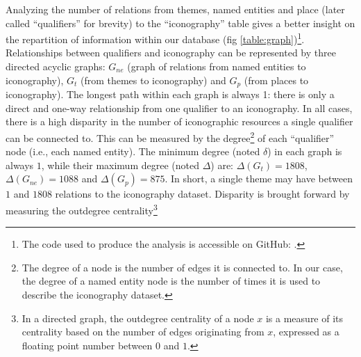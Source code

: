 \documentclass[12pt, a4paper, twocolumn]{article}
\begin{document}
Analyzing the number of relations from themes, named entities and place (later called ``qualifiers'' for brevity) to the ``iconography'' table gives a better insight on the repartition of information within our database (fig \ref{table:graph})\footnote{%
    The code used to produce the analysis is accessible on GitHub: \cite[file \texttt{front/stats\_network.py}]{kerveganRichelieu_jdmdh2025}.%
}. Relationships between qualifiers and iconography can be represented by three directed acyclic graphs: $G_{ne}$ (graph of relations from named entities to iconography), $G_t$ (from themes to iconography) and $G_p$ (from places to iconography). The longest path within each graph is always 1: there is only a direct and one-way relationship from one qualifier to an iconography. In all cases, there is a high disparity in the number of iconographic resources a single qualifier can be connected to. This can be measured by the degree\footnote{%
    The degree of a node is the number of edges it is connected to. In our case, the degree of a named entity node is the number of times it is used to describe the iconography dataset.%
} of each ``qualifier'' node (i.e., each named entity). The minimum degree (noted $\delta$) in each graph is always $1$, while their maximum degree (noted $\Delta$) are: $\Delta(G_t)=1808$, $\Delta(G_{ne})=1088$ and $\Delta(G_p)=875$. In short, a single theme may have between $1$ and $1808$ relations to the iconography dataset. Disparity is brought forward by measuring the outdegree centrality\footnote{%
     In a directed graph, the outdegree centrality of a node $x$ is a measure of its centrality based on the number of edges originating from $x$, expressed as a floating point number between $0$ and $1$.%
}
\end{document}
